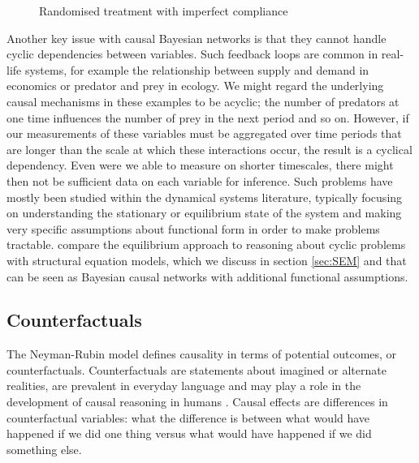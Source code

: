 \documentclass[11pt,a4paper,twoside]{report}
\theoremstyle{plain}
\theoremstyle{definition}
\begin{document}
\begin{figure}[ht]
\centering
{}
\caption{Randomised treatment with imperfect compliance}
\label{fig:randomized_imperfect_compliance}
\end{figure}

Another key issue with causal Bayesian networks is that they cannot handle cyclic dependencies between variables. Such feedback loops are common in real-life systems, for example the relationship between supply and demand in economics or predator and prey in ecology. We might regard the underlying causal mechanisms in these examples to be acyclic; the number of predators at one time influences the number of prey in the next period and so on. However, if our measurements of these variables must be aggregated over time periods that are longer than the scale at which these interactions occur, the result is a cyclical dependency. Even were we able to measure on shorter timescales, there might then not be sufficient data on each variable for inference. Such problems have mostly been studied within the dynamical systems literature, typically focusing on understanding the stationary or equilibrium state of the system and making very specific assumptions about functional form in order to make problems tractable. \citet{Poole2013} compare the equilibrium approach to reasoning about cyclic problems with structural equation models, which we discuss in section \ref{sec:SEM} and that can be seen as Bayesian causal networks with additional functional assumptions. 

\subsection{Counterfactuals}
\label{sec:counterfactuals}

The Neyman-Rubin model \citep{Rubin1974,Rubin1978,Rosenbaum1983, Rubin2005,Rubin2008} defines causality in terms of potential outcomes, or counterfactuals. Counterfactuals are statements about imagined or alternate realities, are prevalent in everyday language and may play a role in the development of causal reasoning in humans \citep{Weisberg2013}. Causal effects are differences in counterfactual variables: what the difference is between what would have happened if we did one thing versus what would have happened if we did something else. 
\end{document}

